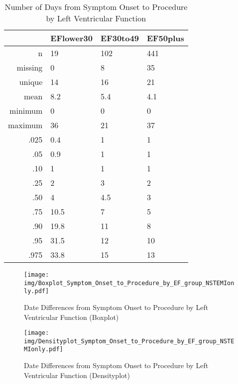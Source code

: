 \documentclass[a4paper]{report}
\begin{document}
\begin{itemize}
{%
\begin{table}[ht]
\centering
\begin{tabular}{rlll}
  \toprule
 & EFlower30 & EF30to49 & EF50plus \\ 
  \midrule
n & 19 & 102 & 441 \\ 
  missing & 0 & 8 & 35 \\ 
  unique & 14 & 16 & 21 \\ 
  mean & 8.2 & 5.4 & 4.1 \\ 
  minimum & 0 & 0 & 0 \\ 
  maximum & 36 & 21 & 37 \\ 
  .025 & 0.4 & 1 & 1 \\ 
  .05 & 0.9 & 1 & 1 \\ 
  .10 & 1 & 1 & 1 \\ 
  .25 & 2 & 3 & 2 \\ 
  .50 & 4 & 4.5 & 3 \\ 
  .75 & 10.5 & 7 & 5 \\ 
  .90 & 19.8 & 11 & 8 \\ 
  .95 & 31.5 & 12 & 10 \\ 
  .975 & 33.8 & 15 & 13 \\ 
   \bottomrule
\end{tabular}
\caption{Number of Days from Symptom Onset to Procedure by Left Ventricular Function} 
\end{table}
\begin{figure}
  \centering
  \caption{Date Differences from Symptom Onset to Procedure by Left Ventricular Function (Boxplot)}
  \label{Boxplot: Date Differences from Symptom Onset to Procedure by Left Ventricular Function}
\texttt{[image: img/Boxplot\_Symptom\_Onset\_to\_Procedure\_by\_EF\_group\_NSTEMIonly.pdf]}\end{figure}


\begin{figure}
  \centering
  \caption{Date Differences from Symptom Onset to Procedure by Left Ventricular Function (Densityplot)}
  \label{Density: Date Differences from Symptom Onset to Procedure by Left Ventricular Function}
\texttt{[image: img/Densityplot\_Symptom\_Onset\_to\_Procedure\_by\_EF\_group\_NSTEMIonly.pdf]}\end{figure}


\clearpage

}
\end{itemize}
\end{document}
